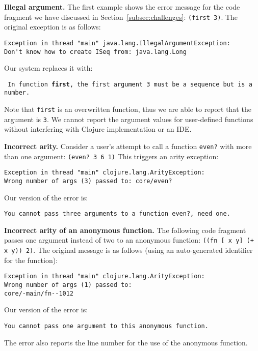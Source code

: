 \documentclass[submission,copyright,creativecommons]{eptcs}
\newcommand{\allcomments}[1]{{#1}}
\newcommand{\emcomment}[1]{{\bf \textcolor{ForestGreen}{\allcomments{{#1}}}}}
\begin{document}

{\bf Illegal argument. }
The first example shows the error message for the code fragment we have discussed in Section~\ref{subsec:challenges}:  {\tt (first 3)}. 
The original exception is as follows: 

\begin{verbatim}
Exception in thread "main" java.lang.IllegalArgumentException:
Don't know how to create ISeq from: java.lang.Long
\end{verbatim}

\noindent
Our system replaces it with:

\noindent
{\tt
In function {\bf first}, the first argument 3 must be a sequence but is a number.
}

Note that {\tt first} is an overwritten function, thus we are able to report that the argument is {\tt 3}. 
We cannot report the argument values for user-defined functions without interfering with Clojure
implementation or an IDE. 

{\bf Incorrect arity.}
Consider a user's attempt to call a function {\tt even?} with more than one argument: {\tt (even? 3 6 1)}
This triggers an arity exception:
\begin{verbatim}
Exception in thread "main" clojure.lang.ArityException:
Wrong number of args (3) passed to: core/even?
\end{verbatim}
Our version of the error is:
\begin{verbatim}
You cannot pass three arguments to a function even?, need one.
\end{verbatim}

{\bf Incorrect arity of an anonymous function.} The following code fragment passes one argument instead of two to an anonymous function:
{\tt ((fn [ x y] (+ x y)) 2)}. The original message is as follows (using an auto-generated identifier for the function): 
\begin{verbatim}
Exception in thread "main" clojure.lang.ArityException:
Wrong number of args (1) passed to: 
core/-main/fn--1012
\end{verbatim}
Our version of the error is:
\begin{verbatim}
You cannot pass one argument to this anonymous function.
\end{verbatim}
The error also reports the line number for the use of the anonymous function. 
\end{document}
